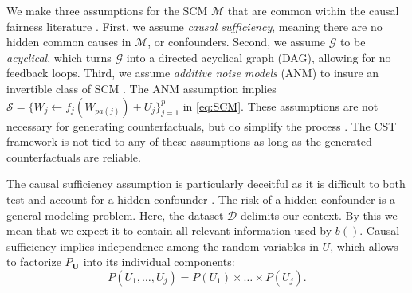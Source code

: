 We make three assumptions for the SCM $\mathcal{M}$ that are common within the causal fairness literature \parencite{DBLP:journals/jlap/MakhloufZP24}. 
First, we assume \textit{causal sufficiency}, meaning there are no hidden common causes in $\mathcal{M}$, or confounders. 
Second, we assume $\mathcal{G}$ to be \textit{acyclical}, which turns $\mathcal{G}$ into a directed acyclical graph (DAG), allowing for no feedback loops.
Third, we assume \textit{additive noise models} (ANM) to insure an invertible class of SCM \parencite{Hoyer2008_ANM}.
%
The ANM assumption implies $\mathcal{S} = \{W_j \leftarrow f_j(W_{pa(j)}) + U_j \}_{j=1}^p$ in \eqref{eq:SCM}.
%
These assumptions are not necessary for generating counterfactuals, but do simplify the process \parencite{Pearl2016_CausalInference}. 
The CST framework is not tied to any of these assumptions as long as the generated counterfactuals are reliable.

The causal sufficiency assumption is particularly deceitful as it is difficult to both test and account for a hidden confounder \parencite{DBLP:journals/corr/abs-1902-10286, mccandless2007bayesian, DBLP:conf/nips/LouizosSMSZW17}. 
The risk of a hidden confounder is a general modeling problem. Here, the dataset $\mathcal{D}$ delimits our context. By this we mean that we expect it to contain all relevant information used by $b()$.
Causal sufficiency implies independence among the random variables in $U$, which allows to factorize $P_{\mathbf{U}}$ into its individual components:
%
\begin{equation}
\label{eq:SCM.Causal.Sufficiency}
    P(U_1, \dots, U_j) = P(U_1) \times \dots \times P(U_j).
\end{equation}
%

